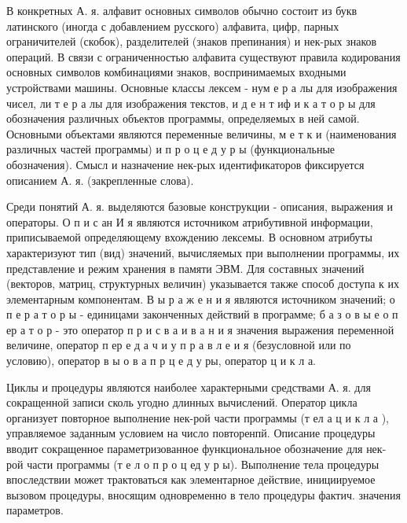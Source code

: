 \documentclass[10pt]{article}
\begin{document}
В конкретных А. я. алфавит основных символов обычно состоит из букв латинского (иногда с добавлением русского) алфавита, цифр, парных ограничителей (скобок), разделителей (знаков препинания) и нек-рых знаков операций. В связи с ограниченностью алфавита существуют правила кодирования основных символов комбинациями знаков, воспринимаемых входными устройствами машины. Основные классы лексем - нум е р а лы для изображения чисел, ли т е р а лы для изображения текстов, и д е н т иф и к а т о р ы для обозначения различных объектов программы, определяемых в ней самой. Основными объектами являются переменные величины, м е т к и (наименования различных частей программы) и п р о ц е д у р ы (функциональные обозначения). Смысл и назначение нек-рых идентификаторов фиксируется описанием А. я. (закрепленные слова).



Среди понятий А. я. выделяются базовые конструкции - описания, выражения и операторы. О п и с ан И я являются источником атрибутивной информации, приписываемой определяющему вхождению лексемы. В основном атрибуты характеризуют тип (вид) значений, вычисляемых при выполнении программы, их представление и режим хранения в памяти ЭВМ. Для составных значений (векторов, матриц, структурных величин) указывается также способ доступа к их элементарным компонентам. В ы р а ж е н и я являются источником значений; о п е р а т о р ы - единицами законченных действий в программе; б а з о в ы е о п ер а т о р - это оператор п р и с в а и в а н и я значения выражения переменной величине, оператор п ер е д а ч и у п р а в л е и я (безусловной или по условию), оператор в ы о в а п р ц е д у ры, оператор ц и к л а.



Циклы и процедуры являются наиболее характерными средствами А. я. для сокращенной записи сколь угодно длинных вычислений. Оператор цикла организует повторное выполнение нек-рой части программы (т ел а ц и к л а ), управляемое заданным условием на число повторенпй. Описание процедуры вводит сокращенное параметризованное функциональное обозначение для нек-рой части программы (т е л о п р о ц ед у р ы). Выполнение тела процедуры впоследствии может трактоваться как элементарное действие, инициируемое вызовом процедуры, вносящим одновременно в тело процедуры фактич. значения параметров.
\end{document}
